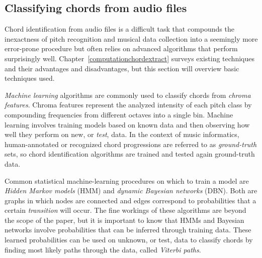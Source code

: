 \subsection{Classifying chords from audio files}

Chord identification from audio files is a difficult task that compounds the inexactness of pitch recognition and musical data collection into a seemingly more error-prone procedure but often relies on advanced algorithms that perform surprisingly well. Chapter~\ref{computationchordextract} surveys existing techniques and their advantages and disadvantages, but this section will overview basic techniques used.

\textit{Machine learning} algorithms are commonly used to classify chords from \textit{chroma features}. Chroma features represent the analyzed intensity of each pitch class by compounding frequencies from different octaves into a single bin. Machine learning involves training models based on known data and then observing how well they perform on new, or \textit{test}, data. In the context of music informatics, human-annotated or recognized chord progressions are referred to as \textit{ground-truth} sets\cite{BurgoyneEtAl_2011_AnExpeGrouSet}, so chord identification algorithms are trained and tested again ground-truth data.

Common statistical machine-learning procedures on which to train a model are \textit{Hidden Markov models} (HMM) and \textit{dynamic Bayesian networks} (DBN). Both are graphs in which nodes are connected and edges correspond to probabilities that a certain \textit{transition} will occur. The fine workings of these algorithms are beyond the scope of the paper, but it is important to know that HMMs and Bayesian networks involve probabilities that can be inferred through training data. These learned probabilities can be used on unknown, or test, data to classify chords by finding most likely paths through the data, called \textit{Viterbi paths}.